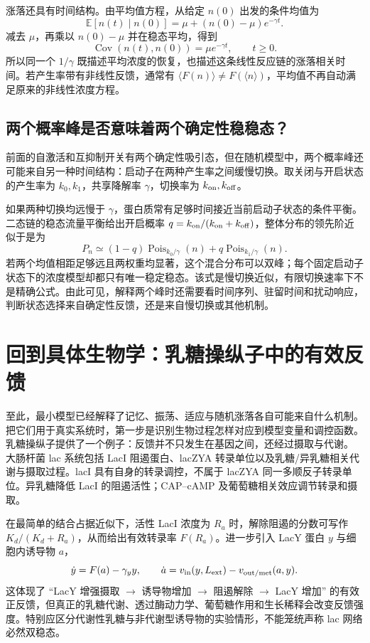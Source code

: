 \documentclass[11pt,a4paper,UTF8,fontset=fandol]{ctexart}
\begin{document}
涨落还具有时间结构。由平均值方程，从给定 $n(0)$ 出发的条件均值为
\[
\mathbb E[n(t)\mid n(0)]=\mu+(n(0)-\mu)e^{-\gamma t}.
\]
减去 $\mu$，再乘以 $n(0)-\mu$ 并在稳态平均，得到
\begin{equation}\operatorname{Cov}(n(t),n(0))=\mu e^{-\gamma t},\qquad t\geq0.\end{equation}
所以同一个 $1/\gamma$ 既描述平均浓度的恢复，也描述这条线性反应链的涨落相关时间。若产生率带有非线性反馈，通常有 $\langle F(n)\rangle\ne F(\langle n\rangle)$，平均值不再自动满足原来的非线性浓度方程。

\subsection{两个概率峰是否意味着两个确定性稳稳态？}
前面的自激活和互抑制开关有两个确定性吸引态，但在随机模型中，两个概率峰还可能来自另一种时间结构：启动子在两种产生率之间缓慢切换。取关闭与开启状态的产生率为 $k_0,k_1$，共享降解率 $\gamma$，切换率为 $k_{\rm on},k_{\rm off}$。

如果两种切换均远慢于 $\gamma$，蛋白质常有足够时间接近当前启动子状态的条件平衡。二态链的稳态流量平衡给出开启概率 $q=k_{\rm on}/(k_{\rm on}+k_{\rm off})$，整体分布的领先阶近似于是为
\[
P_n\simeq(1-q)\operatorname{Pois}_{k_0/\gamma}(n)+q\operatorname{Pois}_{k_1/\gamma}(n).
\]
若两个均值相距足够远且两权重均显著，这个混合分布可以双峰；每个固定启动子状态下的浓度模型却都只有唯一稳定稳态。该式是慢切换近似，有限切换速率下不是精确公式。由此可见，解释两个峰时还需要看时间序列、驻留时间和扰动响应，判断状态选择来自确定性反馈，还是来自慢切换或其他机制。

\section{回到具体生物学：乳糖操纵子中的有效反馈}
至此，最小模型已经解释了记忆、振荡、适应与随机涨落各自可能来自什么机制。把它们用于真实系统时，第一步是识别生物过程怎样对应到模型变量和调控函数。乳糖操纵子提供了一个例子：反馈并不只发生在基因之间，还经过摄取与代谢。
大肠杆菌 lac 系统包括 LacI 阻遏蛋白、lacZYA 转录单位以及乳糖/异乳糖相关代谢与摄取过程。lacI 具有自身的转录调控，不属于 lacZYA 同一多顺反子转录单位。异乳糖降低 LacI 的阻遏活性；CAP--cAMP 及葡萄糖相关效应调节转录和摄取。

在最简单的结合占据近似下，活性 LacI 浓度为 $R_a$ 时，解除阻遏的分数可写作 $K_d/(K_d+R_a)$，从而给出有效转录率 $F(R_a)$。进一步引入 LacY 蛋白 $y$ 与细胞内诱导物 $a$，
\begin{equation}\dot y=F(a)-\gamma_y y,\qquad\dot a=v_{\rm in}(y,L_{\rm ext})-v_{\rm out/met}(a,y).\end{equation}
这体现了 ``LacY 增强摄取 $\to$ 诱导物增加 $\to$ 阻遏解除 $\to$ LacY 增加'' 的有效正反馈，但真正的乳糖代谢、透过酶动力学、葡萄糖作用和生长稀释会改变反馈强度。特别应区分代谢性乳糖与非代谢型诱导物的实验情形，不能笼统声称 lac 网络必然双稳态。
\end{document}

